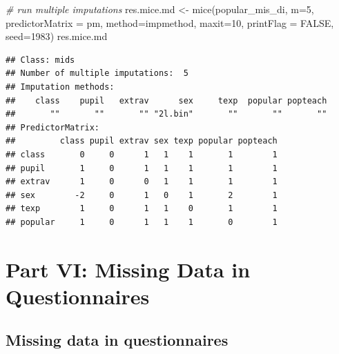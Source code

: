 \documentclass[
]{book}
\newenvironment{Shaded}{\begin{snugshade}}{\end{snugshade}}
\newcommand{\AttributeTok}[1]{\textcolor[rgb]{0.77,0.63,0.00}{#1}}
\newcommand{\CommentTok}[1]{\textcolor[rgb]{0.56,0.35,0.01}{\textit{#1}}}
\newcommand{\ConstantTok}[1]{\textcolor[rgb]{0.00,0.00,0.00}{#1}}
\newcommand{\DecValTok}[1]{\textcolor[rgb]{0.00,0.00,0.81}{#1}}
\newcommand{\FunctionTok}[1]{\textcolor[rgb]{0.00,0.00,0.00}{#1}}
\newcommand{\NormalTok}[1]{#1}
\newcommand{\OtherTok}[1]{\textcolor[rgb]{0.56,0.35,0.01}{#1}}
\begin{document}
\begin{Shaded}
\begin{Highlighting}[]
\CommentTok{\# run multiple imputations}
\NormalTok{res.mice.md }\OtherTok{\textless{}{-}} \FunctionTok{mice}\NormalTok{(popular\_mis\_di, }\AttributeTok{m=}\DecValTok{5}\NormalTok{, }\AttributeTok{predictorMatrix =}\NormalTok{ pm,}
                    \AttributeTok{method=}\NormalTok{impmethod, }\AttributeTok{maxit=}\DecValTok{10}\NormalTok{, }\AttributeTok{printFlag =} \ConstantTok{FALSE}\NormalTok{, }\AttributeTok{seed=}\DecValTok{1983}\NormalTok{)}
\NormalTok{res.mice.md}
\end{Highlighting}
\end{Shaded}

\begin{verbatim}
## Class: mids
## Number of multiple imputations:  5 
## Imputation methods:
##    class    pupil   extrav      sex     texp  popular popteach 
##       ""       ""       "" "2l.bin"       ""       ""       "" 
## PredictorMatrix:
##         class pupil extrav sex texp popular popteach
## class       0     0      1   1    1       1        1
## pupil       1     0      1   1    1       1        1
## extrav      1     0      0   1    1       1        1
## sex        -2     0      1   0    1       2        1
## texp        1     0      1   1    0       1        1
## popular     1     0      1   1    1       0        1
\end{verbatim}

\hypertarget{part-part-vi-missing-data-in-questionnaires}{%
\part{Part VI: Missing Data in Questionnaires}\label{part-part-vi-missing-data-in-questionnaires}}

\hypertarget{missing-data-in-questionnaires}{%
\chapter{Missing data in questionnaires}\label{missing-data-in-questionnaires}}
\end{document}
